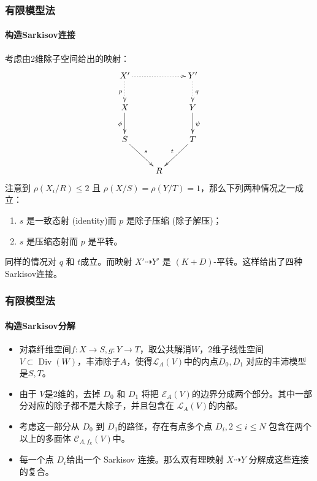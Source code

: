 \documentclass[10pt]{ctexbeamer}
\begin{document}
\begin{frame}[shrink]
  \frametitle{有限模型法}
  \framesubtitle{构造Sarkisov连接}
  考虑由2维除子空间给出的映射：
  \[ \xymatrix{
      X'\ar@{.>}[d]_p\ar@{.>}[rr]&&Y'\ar@{.>}[d]^q\\
      X\ar[d]_{\phi}&&Y\ar[d]^\psi\\
      S\ar[rd]^s&&T\ar[ld]_t\\
      &R&} \]
  \pause
  注意到 $ \rho(X_i/R)\leqslant 2 $ 且 $ \rho(X/S)=\rho(Y/T)=1 $，那么下列两种情况之一成立：
  \begin{enumerate}
    \item $ s $ 是一致态射 (identity)而 $ p $ 是除子压缩 (除子解压)；
    \item $ s $ 是压缩态射而 $ p $ 是平转。
  \end{enumerate}
  \pause
  同样的情况对 $ q $ 和 $ t $成立。而映射 $X'\dashrightarrow Y'$ 是 $(K+D)$-平转。这样给出了四种Sarkisov连接。
\end{frame}

\begin{frame}[shrink]
  \frametitle{有限模型法}
  \framesubtitle{构造Sarkisov分解}
  \begin{itemize}
  \pause
    \item 
  对森纤维空间$f:X\to S,g:Y\to T $，取公共解消$W $，2维子线性空间$V \subset \operatorname{Div}(W)$，丰沛除子$A$，使得$ \mathcal{L}_A(V) $中的内点$ D_{0},D_{1}$ 对应的丰沛模型是$S,T$。
  \pause
    \item 
  由于 $ V $是2维的，去掉 $ D_0 $ 和 $ D_1 $ 将把 $ \mathcal{E}_A(V) $的边界分成两个部分。其中一部分对应的除子都不是大除子，并且包含在 $ \mathcal{L}_A(V) $的内部。
  \pause
    \item 
  考虑这一部分从 $ D_0 $ 到 $ D_1 $的路径，存在有点多个点 $ D_i , 2\leqslant i\leqslant N $ 包含在两个以上的多面体 $ \mathcal{C}_{A,f_{k}}(V) $中。
  \pause
    \item 
  每一个点 $ D_i $给出一个 Sarkisov 连接。那么双有理映射 $X \dashrightarrow Y$ 分解成这些连接的复合。 
  \end{itemize}
\end{frame}
\end{document}
